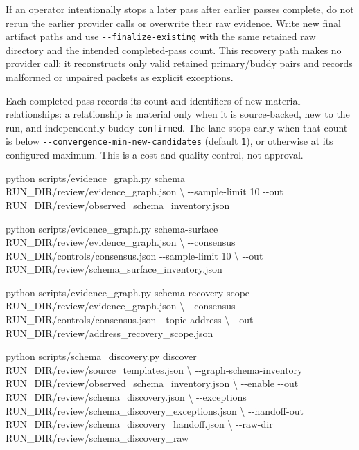 \documentclass[
]{article}
\newenvironment{Shaded}{}{}
\newcommand{\AttributeTok}[1]{\textcolor[rgb]{0.49,0.56,0.16}{#1}}
\newcommand{\DataTypeTok}[1]{\textcolor[rgb]{0.56,0.13,0.00}{#1}}
\newcommand{\ExtensionTok}[1]{#1}
\newcommand{\NormalTok}[1]{#1}
\begin{document}
If an operator intentionally stops a later pass after earlier passes
complete, do not rerun the earlier provider calls or overwrite their raw
evidence. Write new final artifact paths and use
\texttt{-\/-finalize-existing} with the same retained raw directory and
the intended completed-pass count. This recovery path makes no provider
call; it reconstructs only valid retained primary/buddy pairs and
records malformed or unpaired packets as explicit exceptions.

Each completed pass records its count and identifiers of new material
relationships: a relationship is material only when it is source-backed,
new to the run, and independently buddy-\texttt{confirmed}. The lane
stops early when that count is below
\texttt{-\/-convergence-min-new-candidates} (default \texttt{1}), or
otherwise at its configured maximum. This is a cost and quality control,
not approval.

\begin{Shaded}
\begin{Highlighting}[]
\ExtensionTok{python}\NormalTok{ scripts/evidence\_graph.py schema RUN\_DIR/review/evidence\_graph.json }\DataTypeTok{\textbackslash{}}
  \AttributeTok{{-}{-}sample{-}limit}\NormalTok{ 10 }\AttributeTok{{-}{-}out}\NormalTok{ RUN\_DIR/review/observed\_schema\_inventory.json}

\ExtensionTok{python}\NormalTok{ scripts/evidence\_graph.py schema{-}surface RUN\_DIR/review/evidence\_graph.json }\DataTypeTok{\textbackslash{}}
  \AttributeTok{{-}{-}consensus}\NormalTok{ RUN\_DIR/controls/consensus.json }\AttributeTok{{-}{-}sample{-}limit}\NormalTok{ 10 }\DataTypeTok{\textbackslash{}}
  \AttributeTok{{-}{-}out}\NormalTok{ RUN\_DIR/review/schema\_surface\_inventory.json}

\ExtensionTok{python}\NormalTok{ scripts/evidence\_graph.py schema{-}recovery{-}scope RUN\_DIR/review/evidence\_graph.json }\DataTypeTok{\textbackslash{}}
  \AttributeTok{{-}{-}consensus}\NormalTok{ RUN\_DIR/controls/consensus.json }\AttributeTok{{-}{-}topic}\NormalTok{ address }\DataTypeTok{\textbackslash{}}
  \AttributeTok{{-}{-}out}\NormalTok{ RUN\_DIR/review/address\_recovery\_scope.json}

\ExtensionTok{python}\NormalTok{ scripts/schema\_discovery.py discover RUN\_DIR/review/source\_templates.json }\DataTypeTok{\textbackslash{}}
  \AttributeTok{{-}{-}graph{-}schema{-}inventory}\NormalTok{ RUN\_DIR/review/observed\_schema\_inventory.json }\DataTypeTok{\textbackslash{}}
  \AttributeTok{{-}{-}enable} \AttributeTok{{-}{-}out}\NormalTok{ RUN\_DIR/review/schema\_discovery.json }\DataTypeTok{\textbackslash{}}
  \AttributeTok{{-}{-}exceptions}\NormalTok{ RUN\_DIR/review/schema\_discovery\_exceptions.json }\DataTypeTok{\textbackslash{}}
  \AttributeTok{{-}{-}handoff{-}out}\NormalTok{ RUN\_DIR/review/schema\_discovery\_handoff.json }\DataTypeTok{\textbackslash{}}
  \AttributeTok{{-}{-}raw{-}dir}\NormalTok{ RUN\_DIR/review/schema\_discovery\_raw}
\end{Highlighting}
\end{Shaded}
\end{document}
